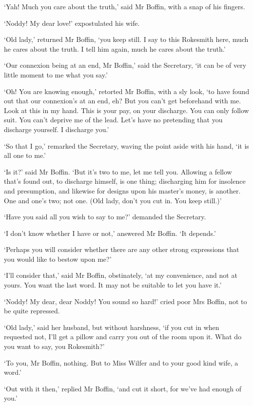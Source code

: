 ‘Yah! Much you care about the truth,’ said Mr Boffin, with a snap of his
fingers.

‘Noddy! My dear love!’ expostulated his wife.

‘Old lady,’ returned Mr Boffin, ‘you keep still. I say to this Rokesmith
here, much he cares about the truth. I tell him again, much he cares
about the truth.’

‘Our connexion being at an end, Mr Boffin,’ said the Secretary, ‘it can
be of very little moment to me what you say.’

‘Oh! You are knowing enough,’ retorted Mr Boffin, with a sly look, ‘to
have found out that our connexion’s at an end, eh? But you can’t get
beforehand with me. Look at this in my hand. This is your pay, on your
discharge. You can only follow suit. You can’t deprive me of the lead.
Let’s have no pretending that you discharge yourself. I discharge you.’

‘So that I go,’ remarked the Secretary, waving the point aside with his
hand, ‘it is all one to me.’

‘Is it?’ said Mr Boffin. ‘But it’s two to me, let me tell you.
Allowing a fellow that’s found out, to discharge himself, is one thing;
discharging him for insolence and presumption, and likewise for designs
upon his master’s money, is another. One and one’s two; not one. (Old
lady, don’t you cut in. You keep still.)’

‘Have you said all you wish to say to me?’ demanded the Secretary.

‘I don’t know whether I have or not,’ answered Mr Boffin. ‘It depends.’

‘Perhaps you will consider whether there are any other strong
expressions that you would like to bestow upon me?’

‘I’ll consider that,’ said Mr Boffin, obstinately, ‘at my convenience,
and not at yours. You want the last word. It may not be suitable to let
you have it.’

‘Noddy! My dear, dear Noddy! You sound so hard!’ cried poor Mrs Boffin,
not to be quite repressed.

‘Old lady,’ said her husband, but without harshness, ‘if you cut in when
requested not, I’ll get a pillow and carry you out of the room upon it.
What do you want to say, you Rokesmith?’

‘To you, Mr Boffin, nothing. But to Miss Wilfer and to your good kind
wife, a word.’

‘Out with it then,’ replied Mr Boffin, ‘and cut it short, for we’ve had
enough of you.’

